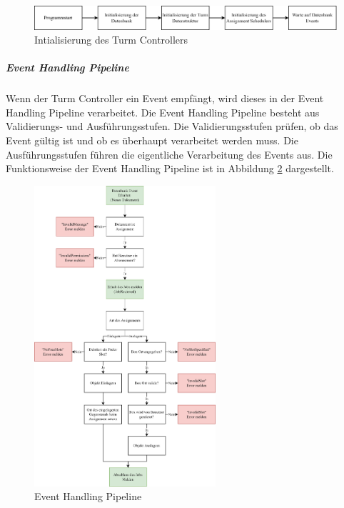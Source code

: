 \begin{figure}[H]
  \centering
  \includegraphics[width=1\textwidth]{images/tower_controller_v4_init.png}
  \caption{Intialisierung des Turm Controllers}
  \label{fig:tower_controller_v4_init}
\end{figure}

\clearpage

\subparagraph{Event Handling Pipeline}

Wenn der Turm Controller ein Event empfängt, wird dieses in der Event Handling Pipeline verarbeitet. Die Event Handling Pipeline besteht aus Validierungs- und Ausführungsstufen. Die Validierungsstufen prüfen, ob das Event gültig ist und ob es überhaupt verarbeitet werden muss. Die Ausführungsstufen führen die eigentliche Verarbeitung des Events aus. Die Funktionsweise der Event Handling Pipeline ist in Abbildung \ref{fig:tower_controller_v4_event_handling} dargestellt.

\begin{figure}[H]
  \centering
  \includegraphics[width=0.6\textwidth]{images/tower_controller_v4_event_handling.png}
  \caption{Event Handling Pipeline}
  \label{fig:tower_controller_v4_event_handling}
\end{figure}

